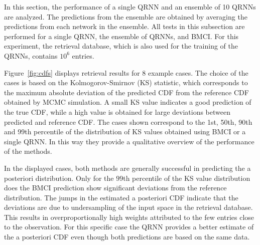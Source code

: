 \documentclass[journal abbreviation, manuscript]{copernicus}
\begin{document}
  In this section, the performance of a single QRNN and an ensemble of 10 QRNNs
  are analyzed. The predictions from the ensemble are obtained by averaging the
  predictions from each network in the ensemble. All tests in this subsection are
  performed for a single QRNN, the ensemble of QRNNs, and BMCI. For this
  experiment, the retrieval database, which is also used for the training of the
  QRNNs, contains $10^6$ entries.

    Figure~\ref{fig:cdfs} displays retrieval results for 8 example cases. The
choice of the cases is based on the Kolmogorov-Smirnov (KS) statistic, which
corresponds to the maximum absolute deviation of the predicted CDF from the
reference CDF obtained by MCMC simulation. A small KS value indicates a good
prediction of the true CDF, while a high value is obtained for large deviations
between predicted and reference CDF. The cases shown correspond to the 1st, 50th,
 90th and 99th percentile of the distribution of KS values obtained using BMCI
or a single QRNN. In this way they provide a qualitative overview of the performance
of the methods.

In the displayed cases, both methods are generally successful in predicting the
a posteriori distribution. Only for the $99$th percentile of the KS value distribution
does the BMCI prediction show significant deviations from the reference distribution.
 The jumps in the estimated a posteriori CDF indicate that the deviations are due to
undersampling of the input space in the retrieval database. This results in
overproportionally high weights attributed to the few entries close to the
observation. For this specific case the QRNN provides a better estimate of the a
posteriori CDF even though both predictions are based on the same data.
\end{document}
